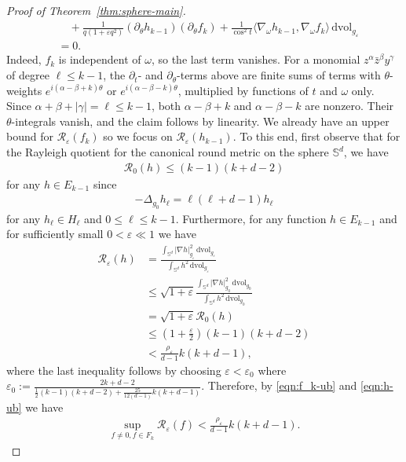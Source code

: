 \documentclass[11pt,reqno]{amsart}
\numberwithin{equation}{section}
\theoremstyle{definition}
\theoremstyle{remark}
\def\cR {\mathcal{R}}
\newcommand{\la}{\langle}
\newcommand{\ra}{\rangle}
\newcommand{\om}{\omega}
\newcommand{\0}{\emptyset}
\newcommand{\veps}{\varepsilon}
\newcommand{\bbS}{\mathbb S}
\newcommand{\dvol}{\,\mathrm{dvol}}
\begin{document}
\begin{proof}[Proof of Theorem~\ref{thm:sphere-main}]
\begin{align}
    &\quad + \frac{1}{q(1+\veps q^2)}(\partial_\theta h_{k-1})(\partial_\theta f_k) + \frac{1}{\cos^2 t}\la \nabla_\om h_{k-1}, \nabla_\om f_k\ra  \dvol_{g_\veps}\\
    &= 0.
\end{align}
Indeed, $f_k$ is independent of $\omega$, so the last term vanishes. For a monomial
$z^\alpha\bar z^\beta y^\gamma$ of degree $\ell\leq k-1$, the $\partial_t$- and
$\partial_\theta$-terms above are finite sums of terms with $\theta$-weights
$e^{i(\alpha-\beta+k)\theta}$ or $e^{i(\alpha-\beta-k)\theta}$, multiplied by
functions of $t$ and $\omega$ only. Since $\alpha+\beta+|\gamma|=\ell\leq k-1$, both
$\alpha-\beta+k$ and $\alpha-\beta-k$ are nonzero. Their $\theta$-integrals vanish,
and the claim follows by linearity. We already have an upper bound for $\cR_\veps(f_k)$ so we focus on $\cR_\veps(h_{k-1}).$ To this end, first observe that for the Rayleigh quotient for the canonical round metric on the sphere $\bbS^d$, we have 
\begin{align}
    \cR_0(h)\leq (k-1)(k+d-2)
\end{align}
for any $h\in E_{k-1}$ since 
\begin{align}
    -\Delta_{g_0} h_{\ell} = \ell(\ell + d-1) h_{\ell}
\end{align}
for any $h_{\ell} \in H_\ell$ and $0\leq \ell\leq k-1.$ Furthermore, for any function $h\in E_{k-1}$ and for sufficiently small $0<\veps\ll 1$ we have
\begin{align}\label{eqn:h-ub}
    \cR_\veps(h) &= \frac{\int_{\bbS^d} |\nabla h|_{g_\veps}^2\dvol_{g_\veps}}{\int_{\bbS^d} h^2 \dvol_{g_\veps}}  \\
    &\leq \sqrt{1+\veps} \frac{\int_{\bbS^d} |\nabla h|_{g_0}^2\dvol_{g_0}}{\int_{\bbS^d} h^2 \dvol_{g_0}}  \\
    &= \sqrt{1+\veps}\cR_0(h)\\
    &\leq \left(1+\frac{\veps}{2}\right) (k-1)(k+d-2)\\
    &< \frac{\rho_\veps}{d-1}k(k+d-1),
\end{align}
where the last inequality follows by choosing $\veps<\veps_0$ where $\veps_0:=\frac{2k+d-2}{\frac{1}{2}(k-1)(k+d-2)+\frac{25}{12(d-1)}k(k+d-1)}$. Therefore, by \eqref{eqn:f_k-ub} and \eqref{eqn:h-ub} we have 
\begin{align}
    \sup_{f\neq 0,f\in F_k}\mathcal{R}_\veps(f)<\frac{\rho_\veps}{d-1}k(k+d-1).
\end{align}

\end{proof}
\end{document}
